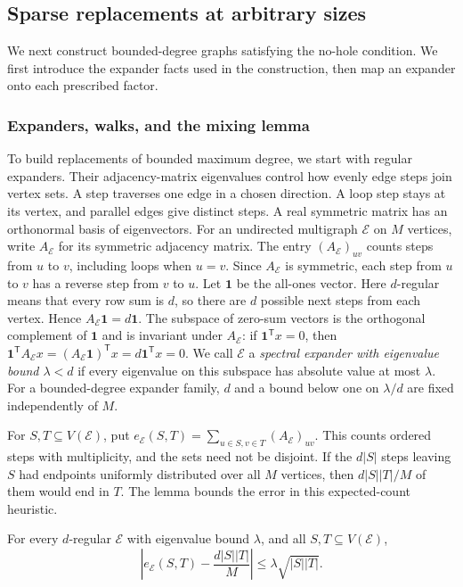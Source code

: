\subsection{Sparse replacements at arbitrary sizes}

We next construct bounded-degree graphs satisfying the no-hole
condition. We first introduce the expander facts used in the
construction, then map an expander onto each prescribed factor.

\subsubsection{Expanders, walks, and the mixing lemma}

To build replacements of bounded maximum degree, we start with regular
expanders. Their adjacency-matrix eigenvalues control how evenly edge
steps join vertex sets. A step traverses one edge in a chosen direction. A loop step
stays at its vertex, and parallel edges give distinct steps. A real
symmetric matrix has an orthonormal basis of eigenvectors. For an
undirected multigraph $\mathcal E$ on $M$ vertices, write
$A_{\mathcal E}$ for its symmetric adjacency matrix. The entry
$(A_{\mathcal E})_{uv}$ counts steps from $u$ to $v$, including loops
when $u=v$. Since $A_{\mathcal E}$ is symmetric, each step from $u$ to
$v$ has a reverse step from $v$ to $u$. Let $\mathbf1$ be the all-ones vector.
Here $d$-regular means that every row sum is $d$, so there are $d$
possible next steps from each vertex. Hence $A_{\mathcal E}\mathbf1=d\mathbf1$.
The subspace of zero-sum vectors is the orthogonal complement of
$\mathbf1$ and is invariant under $A_{\mathcal E}$: if
$\mathbf1^{\mathsf T}x=0$, then
$\mathbf1^{\mathsf T}A_{\mathcal E}x=(A_{\mathcal E}\mathbf1)^{\mathsf T}x
=d\mathbf1^{\mathsf T}x=0$.
We call $\mathcal E$ a
\emph{spectral expander with eigenvalue bound $\lambda<d$} if every
eigenvalue on this subspace has absolute value at most $\lambda$.
For a bounded-degree expander family, $d$ and a bound below one on
$\lambda/d$ are fixed independently of $M$.

For $S,T\subseteq V(\mathcal E)$, put
$e_{\mathcal E}(S,T)=\sum_{u\in S,v\in T}(A_{\mathcal E})_{uv}$.
This counts ordered steps with multiplicity, and the sets need not be
disjoint.
If the $d|S|$ steps leaving $S$ had endpoints uniformly distributed
over all $M$ vertices, then $d|S||T|/M$ of them would end in $T$.
The lemma bounds the error in this expected-count heuristic.

\begin{lemma}
\label{lem:expander-mixing}
For every $d$-regular $\mathcal E$ with eigenvalue bound $\lambda$,
and all $S,T\subseteq V(\mathcal E)$,
\[
 \left|e_{\mathcal E}(S,T)-\frac{d|S||T|}{M}\right|
 \le\lambda\sqrt{|S||T|}.
\]
\end{lemma}

